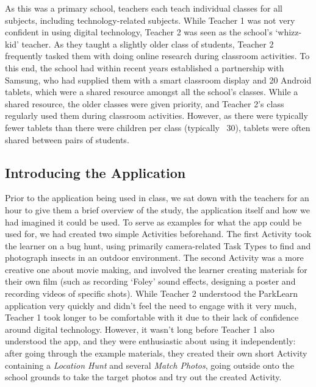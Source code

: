 As this was a primary school, teachers each teach individual classes for all subjects, including technology-related subjects. While Teacher 1 was not very confident in using digital technology, Teacher 2 was seen as the school's `whizz-kid' teacher. As they taught a slightly older class of students, Teacher 2 frequently tasked them with doing online research during classroom activities. To this end, the school had within recent years established a partnership with Samsung, who had supplied them with a smart classroom display and 20 Android tablets, which were a shared resource amongst all the school’s classes. While a shared resource, the older classes were given priority, and Teacher 2's class regularly used them during classroom activities. However, as there were typically fewer tablets than there were children per class (typically ~30), tablets were often shared between pairs of students.

\subsection{Introducing the Application}

Prior to the application being used in class, we sat down with the teachers for an hour to give them a brief overview of the study, the application itself and how we had imagined it could be used. To serve as examples for what the app could be used for, we had created two simple Activities beforehand. The first Activity took the learner on a bug hunt, using primarily camera-related Task Types to find and photograph insects in an outdoor environment. The second Activity was a more creative one about movie making, and involved the learner creating materials for their own film (such as recording `Foley' sound effects, designing a poster and recording videos of specific shots). While Teacher 2 understood the ParkLearn application very quickly and didn't feel the need to engage with it very much, Teacher 1 took longer to be comfortable with it due to their lack of confidence around digital technology. However, it wasn't long before Teacher 1 also understood the app, and they were enthusiastic about using it independently: after going through the example materials, they created their own short Activity containing a \textit{Location Hunt} and several \textit{Match Photos}, going outside onto the school grounds to take the target photos and try out the created Activity. 

